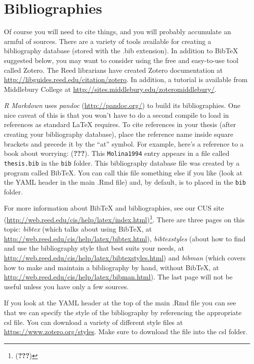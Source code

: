 \documentclass[12pt,twoside]{reedthesis}
\theoremstyle{definition}
\theoremstyle{definition}
\theoremstyle{definition}
\theoremstyle{remark}
\begin{document}
\hypertarget{bibliographies}{%
\section{Bibliographies}\label{bibliographies}}

Of course you will need to cite things, and you will probably accumulate
an armful of sources. There are a variety of tools available for
creating a bibliography database (stored with the .bib extension). In
addition to BibTeX suggested below, you may want to consider using the
free and easy-to-use tool called Zotero. The Reed librarians have
created Zotero documentation at
\url{http://libguides.reed.edu/citation/zotero}. In addition, a tutorial
is available from Middlebury College at
\url{http://sites.middlebury.edu/zoteromiddlebury/}.

\emph{R Markdown} uses \emph{pandoc} (\url{http://pandoc.org/}) to build
its bibliographies. One nice caveat of this is that you won't have to do
a second compile to load in references as standard LaTeX requires. To
cite references in your thesis (after creating your bibliography
database), place the reference name inside square brackets and precede
it by the ``at'' symbol. For example, here's a reference to a book about
worrying: ({\textbf{???}}). This \texttt{Molina1994} entry appears in a
file called \texttt{thesis.bib} in the \texttt{bib} folder. This
bibliography database file was created by a program called BibTeX. You
can call this file something else if you like (look at the YAML header
in the main .Rmd file) and, by default, is to placed in the \texttt{bib}
folder.

For more information about BibTeX and bibliographies, see our CUS site
(\url{http://web.reed.edu/cis/help/latex/index.html})\footnote{({\textbf{???}})}.
There are three pages on this topic: \emph{bibtex} (which talks about
using BibTeX, at \url{http://web.reed.edu/cis/help/latex/bibtex.html}),
\emph{bibtexstyles} (about how to find and use the bibliography style
that best suits your needs, at
\url{http://web.reed.edu/cis/help/latex/bibtexstyles.html}) and
\emph{bibman} (which covers how to make and maintain a bibliography by
hand, without BibTeX, at
\url{http://web.reed.edu/cis/help/latex/bibman.html}). The last page
will not be useful unless you have only a few sources.

If you look at the YAML header at the top of the main .Rmd file you can
see that we can specify the style of the bibliography by referencing the
appropriate csl file. You can download a variety of different style
files at \url{https://www.zotero.org/styles}. Make sure to download the
file into the csl folder.
\end{document}
